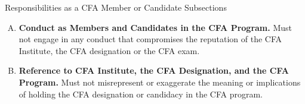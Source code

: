 \documentclass[../custom,grid]{flashcards}
\begin{document}
\begin{flashcard}{Responsibilities as a CFA Member or Candidate Subsections}
    \begin{enumerate}[A.]
        \item \textbf{Conduct as Members and Candidates in the CFA Program.} Must not engage in any conduct that compromises the reputation of the CFA Institute, the CFA designation or the CFA exam.
        \item \textbf{Reference to CFA Institute, the CFA Designation, and the CFA Program.} Must not misrepresent or exaggerate the meaning or implications of holding the CFA designation or candidacy in the CFA program.
    \end{enumerate}
\end{flashcard}
\end{document}
